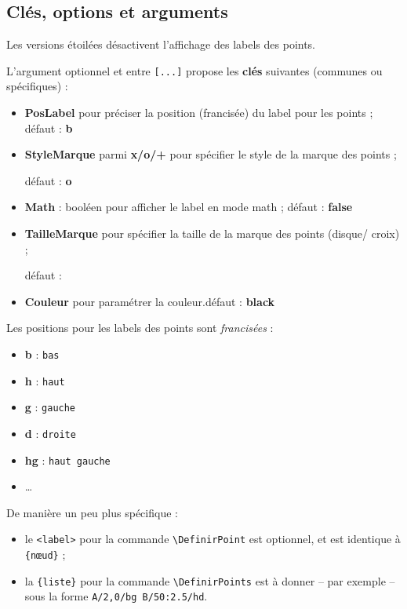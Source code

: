 \documentclass[french,a4paper,11pt]{article}
\newcommand\Cle[1]{{\bfseries\sffamily\textlangle #1\textrangle}}
\begin{document}
\subsection{Clés, options et arguments}

\begin{tipblock}
Les versions étoilées désactivent l'affichage des labels des points.

\smallskip

L'argument optionnel et entre \texttt{[...]} propose les \Cle{clés} suivantes (communes ou spécifiques) :

\begin{itemize}
	\item \Cle{PosLabel} pour préciser la position (francisée) du label pour les points ; \hfill{}défaut : \Cle{b}
	\item \Cle{StyleMarque} parmi \Cle{x/o/+} pour spécifier le style de la marque des points ;
	
	\hfill{}défaut : \Cle{o}
	\item \Cle{Math} : booléen pour afficher le label en mode math ; \hfill{}défaut : \Cle{false}
	\item \Cle{TailleMarque} pour spécifier la taille de la marque des points (disque/ croix) ;
	
	\hfill{}défaut : \Cle{2pt}
	\item \Cle{Couleur} pour paramétrer la couleur.\hfill{}défaut : \Cle{black}
\end{itemize}
\vspace*{-\baselineskip}\leavevmode
\end{tipblock}

\begin{tipblock}
Les positions pour les labels des points sont \textit{francisées} :

\begin{itemize}
	\item \Cle{b} : \texttt{bas}
	\item \Cle{h} : \texttt{haut}
	\item \Cle{g} : \texttt{gauche}
	\item \Cle{d} : \texttt{droite}
	\item \Cle{hg} : \texttt{haut gauche}
	\item \ldots
\end{itemize}
\vspace*{-\baselineskip}\leavevmode
\end{tipblock}

\begin{tipblock}
De manière un peu plus spécifique :

\begin{itemize}
	\item le \texttt{<label>} pour la commande \texttt{\textbackslash DefinirPoint} est optionnel, et est identique à \texttt{\{nœud\}} ;
	\item la \texttt{\{liste\}} pour la commande \texttt{\textbackslash DefinirPoints} est à donner -- par exemple -- sous la forme \texttt{A/2,0/bg B/50:2.5/hd}.
\end{itemize}
\vspace*{-\baselineskip}\leavevmode
\end{tipblock}
\end{document}
